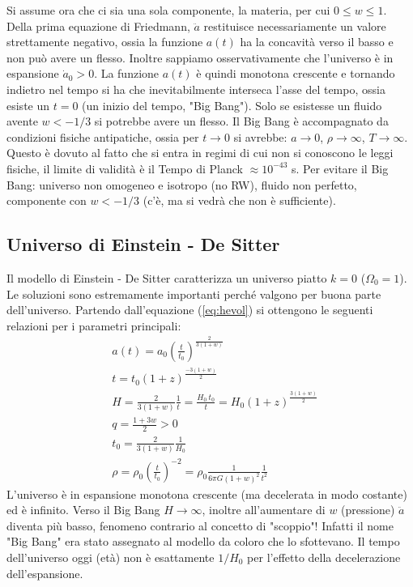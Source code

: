 Si assume ora che ci sia una sola componente, la materia, per cui $0\leq w \leq 1$. Della prima equazione di Friedmann, $\ddot{a}$ restituisce necessariamente un valore strettamente negativo, ossia la funzione $a(t)$ ha la concavità verso il basso e non può avere un flesso. Inoltre sappiamo osservativamente che l'universo è in espansione $\dot{a}_0>0$. La funzione $a(t)$ è quindi monotona crescente e tornando indietro nel tempo si ha che inevitabilmente interseca l'asse del tempo, ossia esiste un $t=0$ (un inizio del tempo, "Big Bang"). Solo se esistesse un fluido avente $w<-1/3$ si potrebbe avere un flesso.  Il Big Bang è accompagnato da condizioni fisiche antipatiche, ossia per $t\rightarrow 0$ si avrebbe: $a\rightarrow 0$, $\rho \rightarrow \infty$, $T \rightarrow \infty$. Questo è dovuto al fatto che si entra in regimi di cui non si conoscono le leggi fisiche, il limite di validità è il Tempo di Planck $\approx 10^{-43}$ s. Per evitare il Big Bang: universo non omogeneo e isotropo (no RW), fluido non perfetto, componente con $w<-1/3$ (c'è, ma si vedrà che non è sufficiente).

\subsection{Universo di Einstein - De Sitter}\label{6:chsub:eds}
Il modello di Einstein - De Sitter caratterizza un universo piatto $k=0$ ($\Omega_0 =1$). Le soluzioni sono estremamente importanti perché valgono per buona parte dell'universo. Partendo dall'equazione (\ref{eq:hevol}) si ottengono le seguenti relazioni per i parametri principali:
\begin{align}
    & a(t) = a_0 \left ( \frac{t}{t_0} \right )^{\frac{2}{3(1+w)}} \\
    & t = t_0 \left ( 1+z \right )^{\frac{-3(1+w)}{2}} \\
    & H = \frac{2}{3(1+w)}\frac{1}{t}=\frac{H_0 ~t_0}{t}=H_0 (1+z)^{\frac{3(1+w)}{2}} \\
    & q = \frac{1+3w}{2} > 0 \\
    & t_0 = \frac{2}{3(1+w)}\frac{1}{H_0} \\
    & \rho  = \rho_0 \left ( \frac{t}{t_0} \right )^{-2}= \rho_0 \frac{1}{6\pi G (1+w)^2}\frac{1}{t^2}
\end{align}
L'universo è in espansione monotona crescente (ma decelerata in modo costante) ed è infinito. Verso il Big Bang $H\rightarrow \infty$, inoltre all'aumentare di $w$ (pressione) $\ddot{a}$ diventa più basso, fenomeno contrario al concetto di "scoppio"! Infatti il nome "Big Bang" era stato assegnato al modello da coloro che lo sfottevano. Il tempo dell'universo oggi (età) non è esattamente $1/H_0$ per l'effetto della decelerazione dell'espansione.


